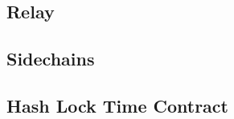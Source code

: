 \subsection[Relay]{Relay}

\subsection[Sidechains]{Sidechains}

\subsection[HLTC]{Hash Lock Time Contract}

